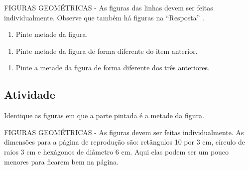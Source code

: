 \documentclass[a4,12pt]{book}
\begin{document}
\begin{imagem*}[breakable]{}{}   FIGURAS GEOMÉTRICAS - As figuras das linhas devem ser feitas individualmente. Observe que também há figuras na   ``Resposta''  .
\end{imagem*}
\begin{enumerate} [\quad a)] %
  \item     Pinte metade da figura.
\end{enumerate} %
\mbox{} \newline  %
\begin{enumerate} [\quad a)] %
  \item     Pinte metade da figura de forma diferente do item anterior.
\end{enumerate} %
\mbox{} \newline  %
\begin{enumerate} [\quad a)] %
  \item     Pinte a metade da figura de forma diferente dos três anteriores.
\end{enumerate} %
\mbox{} \newline  %







\subsection{Atividade}








Identique as figuras em que a parte pintada é a metade da figura.
\begin{imagem*}[breakable]{}{}    FIGURAS GEOMÉTRICAS - As figuras devem ser feitas individualmente. As dimensões para a página de reprodução são: retângulos 10 por 3 cm, círculo de raios 3 cm e hexágonos de diâmetro 6 cm. Aqui elas podem ser um pouco menores para ficarem bem na página.
\end{imagem*}
\end{document}
